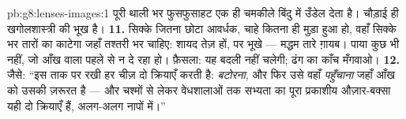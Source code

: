 \begin{solution}{pb:g8:lenses-images:1}
पूरी थाली भर फुसफुसाहट एक ही चमकीले बिंदु में उँडेल देता है। चौड़ाई ही
खगोलशास्त्री की भूख है।
\textbf{11.} सिक्के जितना छोटा आवर्धक, चाहे कितना ही मुड़ा हुआ हो,
वहाँ सिक्के भर तारों का  काटेगा जहाँ तश्तरी भर चाहिए: 
शायद तेज़ हों, पर भूखे --- मद्धम तारे ग़ायब। पाया कुछ भी नहीं, जो
आँख वाला  पहले से न दे रहा हो। फ़ैसला: यह बदली नहीं चलेगी; ढंग का
काँच मँगवाओ।
\textbf{12.} जैसे: ``इस ताक पर रखी हर चीज़ दो क्रियाएँ करती है:
 \emph{बटोरना}, और फिर उसे वहाँ \emph{पहुँचाना} जहाँ आँख को
उसकी ज़रूरत है --- और चश्मों से लेकर वेधशालाओं तक सभ्यता का पूरा
प्रकाशीय औज़ार-बक्सा यही दो क्रियाएँ हैं, अलग-अलग नापों में।''
\end{solution}
